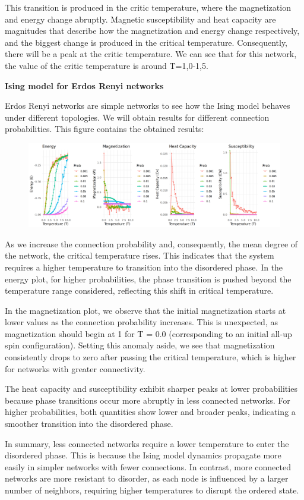 This transition is produced in the critic temperature, where the magnetization and energy change abruptly. Magnetic susceptibility and heat capacity are magnitudes that describe how the magnetization and energy change respectively, and the biggest change is produced in the critical temperature. Consequently, there will be a peak at the critic temperature. We can see that for this network, the value of the critic temperature is around T=1,0-1,5.

\textbf{Ising model for Erdos Renyi networks}

Erdos Renyi networks are simple networks to see how the Ising model behaves under different topologies. We will obtain results for different connection probabilities. This figure contains the obtained results:

\begin{figure}
    \centering
    \includegraphics[width=1\linewidth, height=0.25\linewidth]{images/IM_ER.png}
\end{figure}

\newpage

As we increase the connection probability and, consequently, the mean degree of the network, the critical temperature rises. This indicates that the system requires a higher temperature to transition into the disordered phase. In the energy plot, for higher probabilities, the phase transition is pushed beyond the temperature range considered, reflecting this shift in critical temperature.

In the magnetization plot, we observe that the initial magnetization starts at lower values as the connection probability increases. This is unexpected, as magnetization should begin at 1 for T = 0.0  (corresponding to an initial all-up spin configuration). Setting this anomaly aside, we see that magnetization consistently drops to zero after passing the critical temperature, which is higher for networks with greater connectivity.

The heat capacity and susceptibility exhibit sharper peaks at lower probabilities because phase transitions occur more abruptly in less connected networks. For higher probabilities, both quantities show lower and broader peaks, indicating a smoother transition into the disordered phase.

In summary, less connected networks require a lower temperature to enter the disordered phase. This is because the Ising model dynamics propagate more easily in simpler networks with fewer connections. In contrast, more connected networks are more resistant to disorder, as each node is influenced by a larger number of neighbors, requiring higher temperatures to disrupt the ordered state.

 



\newpage